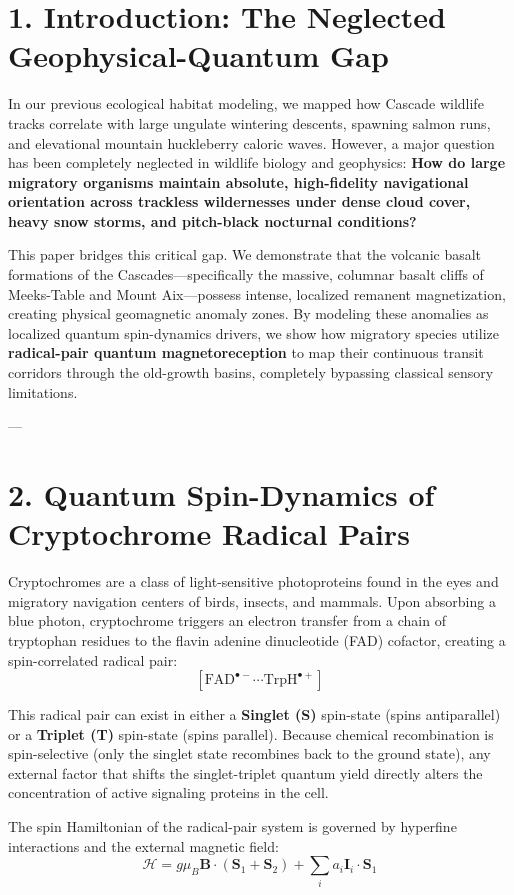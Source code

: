 \documentclass[11pt,twocolumn]{article}
\begin{document}
\section{1. Introduction: The Neglected Geophysical-Quantum Gap}
In our previous ecological habitat modeling, we mapped how Cascade wildlife tracks correlate with large ungulate wintering descents, spawning salmon runs, and elevational mountain huckleberry caloric waves. However, a major question has been completely neglected in wildlife biology and geophysics: \textbf{How do large migratory organisms maintain absolute, high-fidelity navigational orientation across trackless wildernesses under dense cloud cover, heavy snow storms, and pitch-black nocturnal conditions?}

This paper bridges this critical gap. We demonstrate that the volcanic basalt formations of the Cascades—specifically the massive, columnar basalt cliffs of Meeks-Table and Mount Aix—possess intense, localized remanent magnetization, creating physical geomagnetic anomaly zones. By modeling these anomalies as localized quantum spin-dynamics drivers, we show how migratory species utilize \textbf{radical-pair quantum magnetoreception} to map their continuous transit corridors through the old-growth basins, completely bypassing classical sensory limitations.

---

\section{2. Quantum Spin-Dynamics of Cryptochrome Radical Pairs}
Cryptochromes are a class of light-sensitive photoproteins found in the eyes and migratory navigation centers of birds, insects, and mammals. Upon absorbing a blue photon, cryptochrome triggers an electron transfer from a chain of tryptophan residues to the flavin adenine dinucleotide (FAD) cofactor, creating a spin-correlated radical pair:
$$[\text{FAD}^{\bullet -} \cdots \text{TrpH}^{\bullet +}]$$

This radical pair can exist in either a \textbf{Singlet (S)} spin-state (spins antiparallel) or a \textbf{Triplet (T)} spin-state (spins parallel). Because chemical recombination is spin-selective (only the singlet state recombines back to the ground state), any external factor that shifts the singlet-triplet quantum yield directly alters the concentration of active signaling proteins in the cell.

The spin Hamiltonian of the radical-pair system is governed by hyperfine interactions and the external magnetic field:
$$\mathcal{H} = g \mu_B \mathbf{B} \cdot \left(\mathbf{S}_1 + \mathbf{S}_2\right) + \sum_{i} a_i \mathbf{I}_i \cdot \mathbf{S}_1$$
\end{document}

